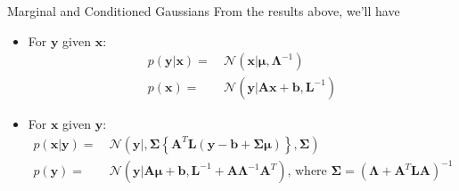 \begin{frame}{\insertsubsection}

\begin{block}{Marginal and Conditioned Gaussians}
From the results above, we'll have
 \\
\begin{itemize}
\item \textcolor{UniGold}{For $\mathbf{y}$ given $\mathbf{x}$:}
\begin{align*}
p\left( \mathbf{y} | \mathbf{x} \right) =& \ \mathcal{N}\left( \mathbf{x}| \boldsymbol{\mu}, \boldsymbol{\Lambda}^{-1} \right) \\
p\left( \mathbf{x} \right) =& \ \mathcal{N}\left( \mathbf{y}| \mathbf{Ax}+\mathbf{b}, \mathbf{L}^{-1} \right)
\end{align*}

\item \textcolor{UniGold}{For $\mathbf{x}$ given $\mathbf{y}$:}
\begin{align*}
p\left( \mathbf{x} | \mathbf{y} \right) =& \ \mathcal{N}\left( \mathbf{y}| ,  \boldsymbol{\Sigma} \left\{ \mathbf{A}^T \mathbf{L}(\mathbf{y}-\mathbf{b} + \boldsymbol{\Sigma \mu}) \right\}, \boldsymbol{\Sigma} \right) \\
p\left( \mathbf{y} \right) =& \ \mathcal{N}\left( \mathbf{y}|\mathbf{A} \boldsymbol{\mu} + \mathbf{b}, \mathbf{L}^{-1} + \mathbf{A}\boldsymbol{\Lambda}^{-1}\mathbf{A}^T \right) \text{, where } \boldsymbol{\Sigma} = \left(  \boldsymbol{\Lambda} + \mathbf{A}^T \mathbf{LA} \right)^{-1}
\end{align*}
\end{itemize}

\end{block}
\end{frame}



































